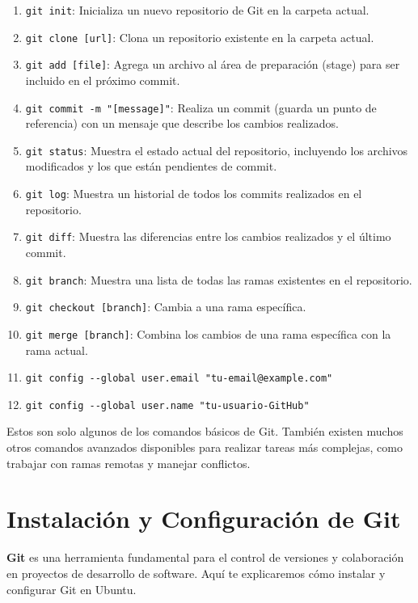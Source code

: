 \documentclass[
  a4paper,
]{article}
\providecommand{\tightlist}{%
  \setlength{\itemsep}{0pt}\setlength{\parskip}{0pt}}\usepackage{longtable,booktabs,array}
\begin{document}
\begin{enumerate}
\def\labelenumi{\arabic{enumi}.}
\tightlist
\item
  \texttt{git\ init}: Inicializa un nuevo repositorio de Git en la
  carpeta actual.
\item
  \texttt{git\ clone\ {[}url{]}}: Clona un repositorio existente en la
  carpeta actual.
\item
  \texttt{git\ add\ {[}file{]}}: Agrega un archivo al área de
  preparación (stage) para ser incluido en el próximo commit.
\item
  \texttt{git\ commit\ -m\ "{[}message{]}"}: Realiza un commit (guarda
  un punto de referencia) con un mensaje que describe los cambios
  realizados.
\item
  \texttt{git\ status}: Muestra el estado actual del repositorio,
  incluyendo los archivos modificados y los que están pendientes de
  commit.
\item
  \texttt{git\ log}: Muestra un historial de todos los commits
  realizados en el repositorio.
\item
  \texttt{git\ diff}: Muestra las diferencias entre los cambios
  realizados y el último commit.
\item
  \texttt{git\ branch}: Muestra una lista de todas las ramas existentes
  en el repositorio.
\item
  \texttt{git\ checkout\ {[}branch{]}}: Cambia a una rama específica.
\item
  \texttt{git\ merge\ {[}branch{]}}: Combina los cambios de una rama
  específica con la rama actual.
\item
  \texttt{git\ config\ -\/-global\ user.email\ "tu-email@example.com"}
\item
  \texttt{git\ config\ -\/-global\ user.name\ "tu-usuario-GitHub"}
\end{enumerate}

Estos son solo algunos de los comandos básicos de Git. También existen
muchos otros comandos avanzados disponibles para realizar tareas más
complejas, como trabajar con ramas remotas y manejar conflictos.

\section{Instalación y Configuración de
Git}\label{instalaciuxf3n-y-configuraciuxf3n-de-git}

\textbf{Git} es una herramienta fundamental para el control de versiones
y colaboración en proyectos de desarrollo de software. Aquí te
explicaremos cómo instalar y configurar Git en Ubuntu.
\end{document}
